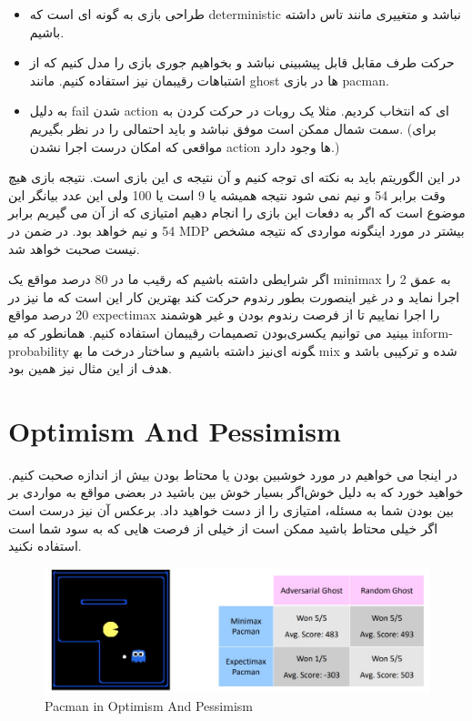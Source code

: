 \begin{itemize}
    \item
طراحی بازی به گونه ای است که deterministic نباشد و متغییری مانند تاس داشته باشیم.
    \item
حرکت طرف مقابل قابل پیشبینی نباشد و بخواهیم جوری بازی را مدل کنیم که از اشتباهات رقیبمان نیز استفاده کنیم. مانند ghost ها در بازی  pacman.
    \item
به دلیل fail شدن action ای که انتخاب کردیم. مثلا یک روبات در حرکت کردن به سمت شمال ممکن است موفق نباشد و باید احتمالی را در نظر بگیریم. (برای مواقعی که امکان درست اجرا نشدن action ها وجود دارد.)
\end{itemize}

در این الگوریتم باید به نکته ای توجه کنیم و آن نتیجه ی این بازی است. نتیجه بازی هیچ وقت برابر 54 و نیم نمی شود نتیجه همیشه یا 9 است یا 100 ولی این عدد بیانگر این موضوع است که اگر به دفعات این بازی را انجام دهیم امتیازی که از آن می گیریم برابر 54 و نیم خواهد بود. در ضمن در MDP بیشتر در مورد اینگونه مواردی که نتیجه مشخص نیست صحبت خواهد شد.

اگر شرایطی داشته باشیم که رقیب ما در 80 درصد مواقع یک minimax به عمق 2 را اجرا نماید و در غیر اینصورت بطور رندوم حرکت کند بهترین کار این است که ما نیز در 20 درصد مواقع expectimax را اجرا نماییم تا از فرصت رندوم بودن و غیر هوشمند بودن تصمیمات رقیبمان استفاده کنیم. همانطور که می‎بینید می توانیم یکسری inform-probability نیز داشته باشیم و ساختار درخت ما به‎گونه ای mix شده و ترکیبی باشد و هدف از این مثال نیز همین بود.

\section{Optimism And Pessimism}

در اینجا می خواهیم در مورد خوشبین بودن یا محتاط بودن بیش از اندازه صحبت کنیم. اگر بسیار خوش بین باشید در بعضی مواقع به مواردی بر‎خواهید خورد که به دلیل خوش بین بودن شما به مسئله، امتیازی را از دست خواهید داد. برعکس آن نیز درست است اگر خیلی محتاط باشید ممکن است از خیلی از فرصت هایی که به سود شما است استفاده نکنید.

\begin{figure}[h!]
    \centering
    \includegraphics[width=0.8\linewidth]{images/PacmaninOptimismAndPessimism.jpg}
    \caption{Pacman in Optimism And Pessimism}
\end{figure}


